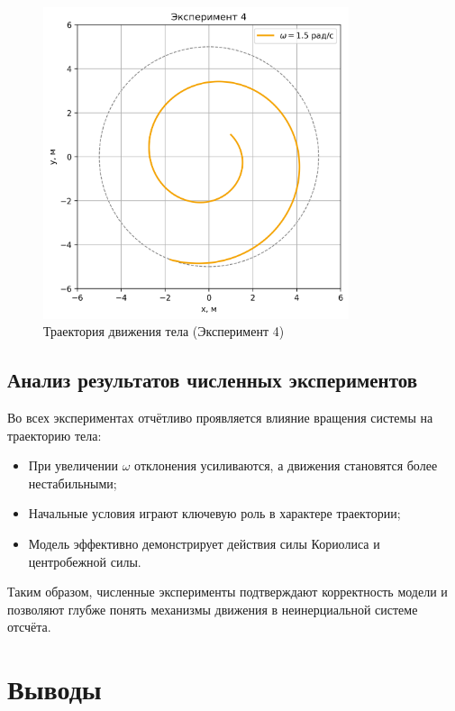 \documentclass[a4paper,12pt]{article}
\begin{document}
\begin{figure}[H]
    \centering
    \includegraphics[width=0.8\textwidth]{plots/experiment_4.png}
    \caption{Траектория движения тела (Эксперимент 4)}
\end{figure}

\newpage

\subsection*{Анализ результатов численных экспериментов}

Во всех экспериментах отчётливо проявляется влияние вращения системы на траекторию тела:

\begin{itemize}
    \item При увеличении $\omega$ отклонения усиливаются, а движения становятся более нестабильными;
    \item Начальные условия играют ключевую роль в характере траектории;
    \item Модель эффективно демонстрирует действия силы Кориолиса и центробежной силы.
\end{itemize}

Таким образом, численные эксперименты подтверждают корректность модели и позволяют глубже понять механизмы движения в неинерциальной системе отсчёта.


\newpage

\section{Выводы}
\end{document}
